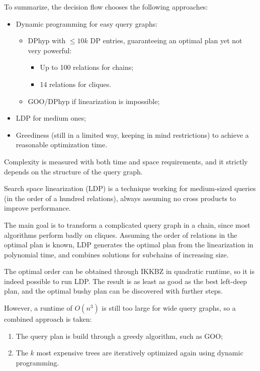 To summarize, the decision flow chooses the following approaches:
\begin{itemize}
	\item Dynamic programming for easy query graphs:
	\begin{itemize}
		\item DPhyp with $\leq 10k$ DP entries, guaranteeing an optimal plan yet not very powerful:
		\begin{itemize}
			\item Up to 100 relations for chains;
			\item 14 relations for cliques.
		\end{itemize}
		\item GOO/DPhyp if linearization is impossible;
	\end{itemize}
	\item LDP for medium ones;
	\item Greediness (still in a limited way, keeping in mind restrictions) to achieve a reasonable optimization time.
\end{itemize}

Complexity is measured with both time and space requirements, and it strictly depends on the structure of the query graph.

Search space linearization (LDP) is a technique working for medium-sized queries (in the order of a hundred relations), always assuming no cross products to improve performance. 

The main goal is to transform a complicated query graph in a chain, since most algorithms perform badly on cliques. Assuming the order of relations in the optimal plan is known, LDP generates the optimal plan from the linearization in polynomial time, and combines solutions for subchains of increasing size.

The optimal order can be obtained through IKKBZ in quadratic runtime, so it is indeed possible to run LDP. The result is as least as good as the best left-deep plan, and the optimal bushy plan can be discovered with further steps.

However, a runtime of $O(n^3)$ is still too large for wide query graphs, so a combined approach is taken:
\begin{enumerate}
	\item The query plan is build through a greedy algorithm, such as GOO;
	\item The $k$ most expensive trees are iteratively optimized again using dynamic programming.
\end{enumerate}

